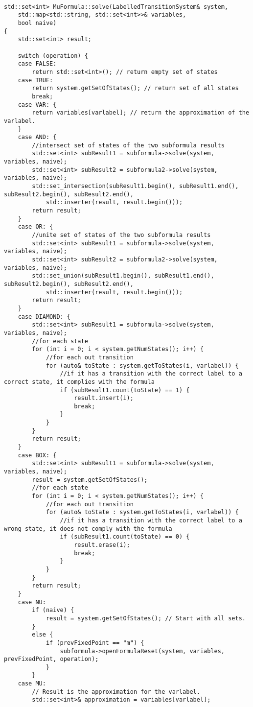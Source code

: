 \documentclass[10pt,a4paper]{article}
\begin{document}
\begin{lstlisting}[caption=MuCalculus.cpp]

std::set<int> MuFormula::solve(LabelledTransitionSystem& system, 
	std::map<std::string, std::set<int>>& variables, 
	bool naive) 
{
    std::set<int> result;

    switch (operation) {
    case FALSE:
        return std::set<int>(); // return empty set of states
    case TRUE:
        return system.getSetOfStates(); // return set of all states
        break;
    case VAR: {
        return variables[varlabel]; // return the approximation of the varlabel.
    }
    case AND: {
        //intersect set of states of the two subformula results
        std::set<int> subResult1 = subformula->solve(system, variables, naive);
        std::set<int> subResult2 = subformula2->solve(system, variables, naive);
        std::set_intersection(subResult1.begin(), subResult1.end(), subResult2.begin(), subResult2.end(),
            std::inserter(result, result.begin()));
        return result;
    }
    case OR: {
        //unite set of states of the two subformula results
        std::set<int> subResult1 = subformula->solve(system, variables, naive);
        std::set<int> subResult2 = subformula2->solve(system, variables, naive);
        std::set_union(subResult1.begin(), subResult1.end(), subResult2.begin(), subResult2.end(),
            std::inserter(result, result.begin()));
        return result;
    }
    case DIAMOND: {
        std::set<int> subResult1 = subformula->solve(system, variables, naive);
        //for each state
        for (int i = 0; i < system.getNumStates(); i++) {
            //for each out transition
            for (auto& toState : system.getToStates(i, varlabel)) {
                //if it has a transition with the correct label to a correct state, it complies with the formula
                if (subResult1.count(toState) == 1) {
                    result.insert(i);
                    break;
                }
            }
        }
        return result;
    }
    case BOX: {
        std::set<int> subResult1 = subformula->solve(system, variables, naive);
        result = system.getSetOfStates();
        //for each state
        for (int i = 0; i < system.getNumStates(); i++) {
            //for each out transition
            for (auto& toState : system.getToStates(i, varlabel)) {
                //if it has a transition with the correct label to a wrong state, it does not comply with the formula
                if (subResult1.count(toState) == 0) {
                    result.erase(i);
                    break;
                }
            }
        }
        return result;
    }
    case NU:
        if (naive) {
            result = system.getSetOfStates(); // Start with all sets.
        }
        else {
            if (prevFixedPoint == "m") {
                subformula->openFormulaReset(system, variables, prevFixedPoint, operation);
            }
        }
    case MU:
        // Result is the approximation for the varlabel.
        std::set<int>& approximation = variables[varlabel];


\end{lstlisting}
\end{document}

